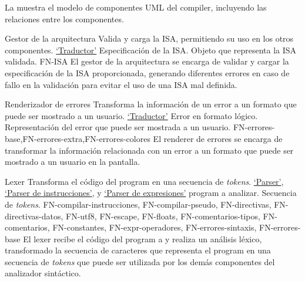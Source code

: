 La  muestra el modelo de componentes UML
\parencite{UMLSpec} del \gls{compiler}, incluyendo las relaciones entre los
componentes.


\printcomptemplate

\newcommand{\componentref}[1]{\hyperref[req:#1]{`#1'}}

\begin{component}{Gestor de la arquitectura}
    {Valida y carga la \gls{ISA}, permitiendo su uso en los otros componentes.} %
    {\componentref{Traductor}} %
    {Especificación de la \gls{ISA}.} %
    {Objeto que representa la \gls{ISA} validada.} %
    {FN-ISA} %
    El gestor de la arquitectura se encarga de validar y cargar la
    especificación de la \gls{ISA} proporcionada, generando diferentes errores
    en caso de fallo en la validación para evitar el uso de una \gls{ISA} mal
    definida.
\end{component}

\begin{component}{Renderizador de errores}
    {Transforma la información de un error a un formato que puede ser mostrado a un usuario.} %
    {\componentref{Traductor}} %
    {Error en formato lógico.} %
    {Representación del error que puede ser mostrada a un usuario.} %
    {FN-errores-base,FN-errores-extra,FN-errores-colores} %
    El \gls{renderer} de errores se encarga de transformar la información
    relacionada con un error a un formato que puede ser mostrado a un usuario en
    la pantalla.
\end{component}

\begin{component}{Lexer}
    {Transforma el código del \gls{program} en una secuencia de \textit{\glspl{token}}.} %
    {\componentref{Parser}, \componentref{Parser de instrucciones}, y \componentref{Parser de expresiones}} %
    {\Gls{program} a analizar.} %
    {Secuencia de \textit{\glspl{token}}.} %
    {FN-compilar-instrucciones, FN-compilar-pseudo, FN-directivas,
    FN-directivas-datos, FN-utf8, FN-escape, FN-floats, FN-comentarios-tipos,
    FN-comentarios, FN-constantes, FN-expr-operadores, FN-errores-sintaxis,
    FN-errores-base} %
    El lexer recibe el código del \gls{program} a
     y realiza un análisis léxico, transformado
    la secuencia de caracteres que representa el \gls{program} en una secuencia
    de \textit{\glspl{token}} que puede ser utilizada por los demás componentes
    del analizador sintáctico.
\end{component}

